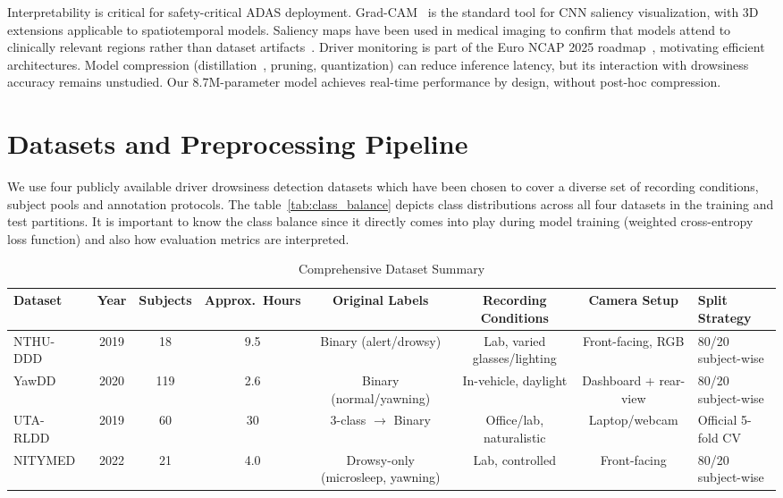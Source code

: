 \documentclass[journal]{IEEEtran}
\begin{document}
Interpretability is critical for safety-critical ADAS deployment. Grad-CAM~\cite{selvaraju2017} is the standard tool for CNN saliency visualization, with 3D extensions applicable to spatiotemporal models. Saliency maps have been used in medical imaging to confirm that models attend to clinically relevant regions rather than dataset artifacts~\cite{zech2018}. Driver monitoring is part of the Euro NCAP 2025 roadmap~\cite{euroncap2020}, motivating efficient architectures. Model compression (distillation~\cite{hinton2015}, pruning, quantization) can reduce inference latency, but its interaction with drowsiness accuracy remains unstudied. Our 8.7M-parameter model achieves real-time performance by design, without post-hoc compression.

\section{Datasets and Preprocessing Pipeline}
\label{sec:datasets}

We use four publicly available driver drowsiness detection datasets which have been chosen to cover a diverse set of recording conditions, subject pools and annotation protocols. The table~\ref{tab:class_balance} depicts class distributions across all four datasets in the training and test partitions. It is important to know the class balance since it directly comes into play during model training (weighted cross-entropy loss function) and also how evaluation metrics are interpreted.

\begin{table}[t]
  \caption{Comprehensive Dataset Summary}
  \label{tab:datasets}
  \centering
  \small
  \begin{tabular}{lccccccl}
    \toprule
    Dataset & Year & Subjects & Approx.\ Hours & Original Labels & Recording Conditions & Camera Setup & Split Strategy \\
    \midrule
    NTHU-DDD~\cite{ghoddoosian2019}  & 2019 & 18  & 9.5 & Binary (alert/drowsy) & Lab, varied glasses/lighting & Front-facing, RGB & 80/20 subject-wise \\
    YawDD~\cite{abtahi2014}           & 2020 & 119 & 2.6 & Binary (normal/yawning) & In-vehicle, daylight & Dashboard + rear-view & 80/20 subject-wise \\
    UTA-RLDD~\cite{ghoddoosian2019} & 2019 & 60  & 30  & 3-class $\rightarrow$ Binary & Office/lab, naturalistic & Laptop/webcam & Official 5-fold CV \\
    NITYMED~\cite{nitymed2020}        & 2022 & 21  & 4.0 & Drowsy-only (microsleep, yawning) & Lab, controlled & Front-facing & 80/20 subject-wise \\
    \bottomrule
  \end{tabular}
\end{table}
\end{document}
